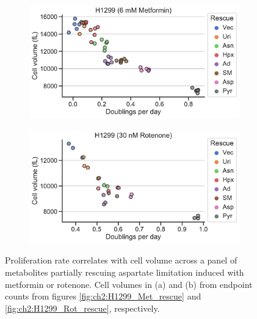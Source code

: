 \begin{figure}
     \centering
     \begin{subfigure}[b]{0.49\textwidth}
         \includegraphics[width=\textwidth]{figures/chap6/H1299_Met_cellvol.pdf}
         \caption{}
         \label{fig:ch6:H1299_Met_cellvol}
     \end{subfigure}
     \hfill
     \begin{subfigure}[b]{0.49\textwidth}
         \includegraphics[width=\textwidth]{figures/chap6/H1299_Rot_cellvol.pdf}
         \caption{}
         \label{fig:ch6:H1299_Rot_cellvol}
     \end{subfigure}
        \caption[Proliferation rate correlation with cell volume.]{
        Proliferation rate correlates with cell volume across a panel of metabolites partially rescuing aspartate limitation induced with metformin or rotenone.
        Cell volumes in (a) and (b) from endpoint counts from figures \ref{fig:ch2:H1299_Met_rescue} and \ref{fig:ch2:H1299_Rot_rescue}, respectively.
        }
        \label{fig:ch6:H1299_ETCrescue_vol}
\end{figure}

